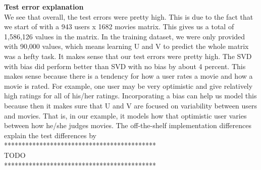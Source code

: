 \noindent\textbf{Test error explanation }\\
We see that overall, the test errors were pretty high. This is due to the fact that we start of with a 943 users x 1682 movies matrix. This gives us a total of 1,586,126 values in the matrix. In the training dataset, we were only provided with 90,000 values, which means learning U and V to predict the whole matrix was a hefty task. It makes sense that our test errors were pretty high. The SVD with bias did perform better than SVD with no bias by about 4 percent. This makes sense because there is a tendency for how a user rates a movie and how a movie is rated. For example, one user may be very optimistic and give relatively high ratings for all of his/her ratings. Incorporating a bias can help us model this because then it makes sure that U and V are focused on variability between users and movies. That is, in our example, it models how that optimistic user varies between how he/she judges movies. The off-the-shelf implementation differences explain the test differences by \\
*******************************************\\
TODO \\
*******************************************\\


\newpage


